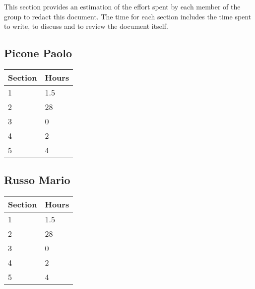 This section provides an estimation of the effort spent by each member of the group to redact this document. The time for each section includes the time spent to write, to discuss and to review the document itself.\\


\subsection*{Picone Paolo}
\begin{tabular}{|p{7cm}|p{7cm}|}
    \hline
    \textbf{Section} & \textbf{Hours}\\
    \hline
    1 & 1.5\\
    \hline
    2 & 28\\
    \hline
    3 & 0\\
    \hline
    4 & 2\\
    \hline
    5 & 4\\
    \hline
\end{tabular}


\subsection*{Russo Mario}
\begin{tabular}{|p{7cm}|p{7cm}|}
    \hline
    \textbf{Section} & \textbf{Hours}\\
    \hline
    1 & 1.5\\
    \hline
    2 & 28\\
    \hline
    3 & 0\\
    \hline
    4 & 2\\
    \hline
    5 & 4\\
    \hline
\end{tabular}
